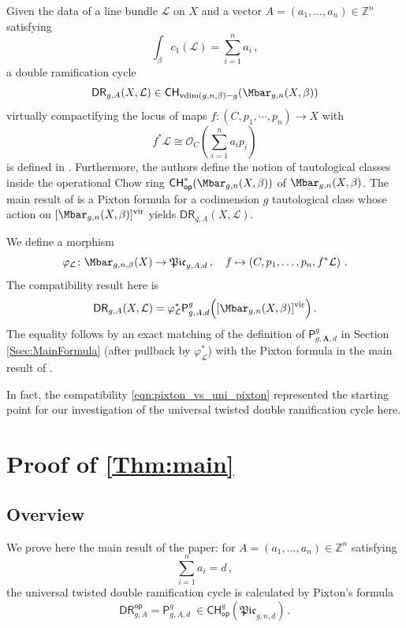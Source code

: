 \documentclass[a4paper,12pt]{article} %
\newcommand{\ca}[1]{{\mathcal{#1}}}
\newcommand{\bd}[1]{{\mathbf{#1}}}
\def\P{\mathsf{P}}
\def\DR{\mathsf{DR}}
\theoremstyle{definition}
\theoremstyle{plain}%
\newcommand{\MbarX}{\Mbar_{g,n}(X, \beta)}
\renewcommand{\phi}{\varphi}
\newcommand{\vdim}{\mathrm{vdim}}
\newcommand{\Picabs}{\mathfrak{Pic}}
\newcommand{\Chow}{\mathsf{CH}}
\newcommand{\CHop}{\Chow_{\mathsf{op}}}
\begin{document}
Given the data of a line bundle $\ca L$ on $X$ and a vector $A=(a_1,\ldots, a_n) \in \mathbb{Z}^n$ satisfying
\[\int_{\beta}c_1(\ca L)=\sum_{i=1}^{n}a_i \, ,\]
a double ramification cycle 
\[\DR_{g,A}(X,\ca L) \in \Chow_{\vdim(g,n,\beta)-g}(\MbarX)\]
virtually compactifying the locus of maps $f\colon (C,p_1,\cdots,p_n)\to X$ with
\[f^* \mathcal{L} \cong \mathcal{O}_C \left(\sum_{i=1}^n a_i p_i \right)\]
is defined in \cite{Janda2018Double-ramifica}. 
Furthermore, the authors define the notion of tautological classes
inside the operational Chow ring $\CHop^*(\MbarX)$ of $\MbarX$.
The main result of \cite{Janda2018Double-ramifica} is a
Pixton  formula for a 
codimension $g$ tautological class   whose action on $[\MbarX]^\textup{vir}$ yields $\DR_{g,A}(X,\ca L)$.


We define a morphism 
\begin{equation*}
\phi_{\ca L}\colon \Mbar_{g,n,\beta}(X) \to \Picabs_{g,A,d}\, , \ \ \  f \mapsto \left(C, p_1, \ldots, p_n, f^*\ca L \right)\, . 
\end{equation*}
The compatibility result here is
\begin{equation}\label{eqn:pixton_vs_uni_pixton}
\DR_{g,A}(X,\ca L) = \phi_{\ca L}^* \P^g_{g,A,d} \Big( [\MbarX]^\textup{vir}\Big)\, .
\end{equation}
The equality follows by an exact matching of the definition of 
$\P^g_{g,\bd A,d}$ in Section \ref{Ssec:MainFormula}
(after pullback by $\phi_{\ca L}^*$) with the
Pixton formula in the main result of \cite{Janda2018Double-ramifica}.

In fact, the compatibility \eqref{eqn:pixton_vs_uni_pixton}
represented the starting point for our investigation of the 
universal twisted double ramification cycle here.





\section{Proof of \texorpdfstring{\cref{Thm:main}}{main theorem}}\label{sec:proof_of_main_theorem}
\subsection{Overview} \label{sec:proof_of_main_theorem_overview}
We prove here the main result of the paper:
for $A=(a_1,\ldots,a_n)\in \mathbb{Z}^n$  satisfying $$\sum_{i=1}^n a_i=d\, ,$$
the universal twisted double ramification cycle is calculated by Pixton's formula
$$\mathsf{DR}^{\mathsf{op}}_{g,A} =\P_{g,A,d}^g\
\in {\mathsf{CH}}^g_{\mathsf{op}}(\Picabs_{g,n,d})\, .$$
\end{document}

